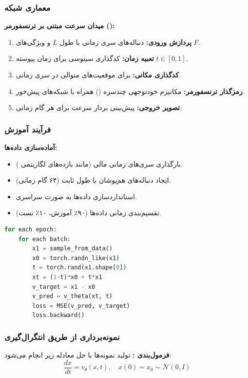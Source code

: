 \subsubsection{معماری شبکه}
\textbf{میدان سرعت مبتنی بر ترنسفورمر ():}
\begin{enumerate}
    \item \textbf{پردازش ورودی:} دنباله‌های سری زمانی با طول $L$ و ویژگی‌های $F$.
    \item \textbf{تعبیه زمان:} کدگذاری سینوسی برای زمان پیوسته $t \in [0,1]$.
    \item \textbf{کدگذاری مکانی:} برای موقعیت‌های متوالی در سری زمانی.
    \item \textbf{رمزگذار ترنسفورمر:} مکانیزم خود‌توجهی چند‌سره () همراه با شبکه‌های پیش‌خور.
    \item \textbf{تصویر خروجی:} پیش‌بینی بردار سرعت برای هر گام زمانی.
\end{enumerate}



\subsubsection{فرآیند آموزش}
\textbf{آماده‌سازی داده‌ها:}
\begin{itemize}
    \item بارگذاری سری‌های زمانی مالی (مانند بازده‌های لگاریتمی ).
    \item ایجاد دنباله‌های هم‌پوشان با طول ثابت (۶۴ گام زمانی).
    \item استانداردسازی داده‌ها به صورت سراسری.
    \item تقسیم‌بندی زمانی داده‌ها (۹۰٪ آموزش، ۱۰٪ تست).
\end{itemize}

\begin{latin}
\begin{lstlisting}[language=Python, caption=Flow Matching Training Loop]
for each epoch:
    for each batch:
        x1 = sample_from_data()
        x0 = torch.randn_like(x1)
        t = torch.rand(x1.shape[0])
        xt = (1-t)*x0 + t*x1
        v_target = x1 - x0
        v_pred = v_theta(xt, t)
        loss = MSE(v_pred, v_target)
        loss.backward()
\end{lstlisting}
\end{latin}

\subsubsection{نمونه‌برداری از طریق انتگرال‌گیری }
\textbf{فرمول‌بندی :} تولید نمونه‌ها با حل معادله زیر انجام می‌شود:
\[ \frac{dx}{dt} = v_\theta(x, t), \quad x(0) = x_0 \sim \mathcal{N}(0, I) \]

